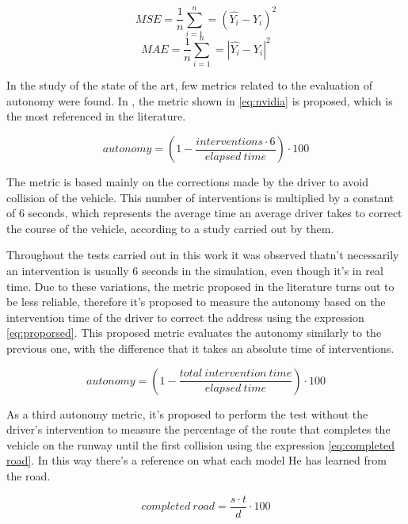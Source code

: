 \documentclass{cys}
\begin{document}
\begin{equation}
	MSE = \frac{1}{n} \sum_{i=1}^{n} = (\hat{Y_i} - Y_i)^2
	\label{eq:mse}
\end{equation}
\begin{equation}
	MAE = \frac{1}{n} \sum_{i=1}^{n} = |\hat{Y_i} - Y_i|^2
	\label{eq:mae}
\end{equation}



In the study of the state of the art, few metrics related to the evaluation of autonomy were found. In \cite{bojarski2016end}, the metric shown in \ref{eq:nvidia} is proposed, which is the most referenced in the literature.

\begin{equation}
autonomy = (1 - \frac{interventions \cdot 6}{elapsed\ time}) \cdot 100
\label{eq:nvidia}
\end{equation}

The metric is based mainly on the corrections made by the driver to avoid collision of the vehicle. This number of interventions is multiplied by a constant of 6 seconds, which represents the average time an average driver takes to correct the course of the vehicle, according to a study carried out by them.

Throughout the tests carried out in this work it was observed thatn't necessarily an intervention is usually 6 seconds in the simulation, even though it's in real time. Due to these variations, the metric proposed in the literature turns out to be less reliable, therefore it's proposed to measure the autonomy based on the intervention time of the driver to correct the address using the expression \ref{eq:proporsed}. This proposed metric evaluates the autonomy similarly to the previous one, with the difference that it takes an absolute time of interventions.

\begin{equation}
autonomy = (1 - \frac{total\ intervention\ time}{elapsed\ time})\cdot 100
\label{eq:proporsed}
\end{equation}

As a third autonomy metric, it's proposed to perform the test without the driver's intervention to measure the percentage of the route that completes the vehicle on the runway until the first collision using the expression \ref{eq:completed road}. In this way there's a reference on what each model He has learned from the road.

\begin{equation}
completed\ road = \frac{s \cdot t}{d} \cdot 100
\label{eq:completed road}
\end{equation}
\end{document}
